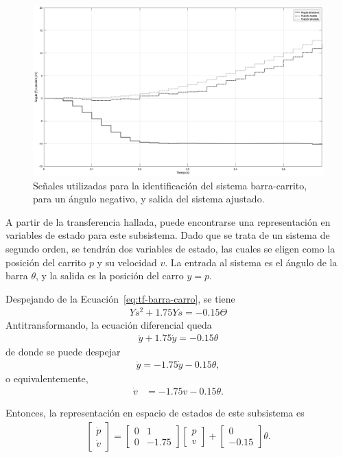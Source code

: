 \begin{figure}[!tbp]
    \centering
    \includegraphics[width=\linewidth]{img/ident-carrito2.eps}
    \caption{Señales utilizadas para la identificación del sistema barra-carrito, para un ángulo negativo, y salida del sistema ajustado.}
    \label{fig:ident-carro2}
\end{figure}

A partir de la transferencia hallada, puede encontrarse una representación en variables de estado para este subsistema. Dado que se trata de un sistema de segundo orden, se tendrán dos variables de estado, las cuales se eligen como la posición del carrito $p$ y su velocidad $v$. La entrada al sistema es el ángulo de la barra $\theta$, y la salida es la posición del carro $y = p$.

Despejando de la Ecuación~\eqref{eq:tf-barra-carro}, se tiene
\begin{align*}
    Ys^{2} + 1.75 Y s = -0.15 \Theta
\end{align*}
Antitransformando, la ecuación diferencial queda
\begin{align*}
    \ddot{y} + 1.75 \dot{y} = -0.15 \theta
\end{align*}
de donde se puede despejar
\begin{align*}
    \ddot{y} = -1.75 \dot{y} - 0.15 \theta,
\end{align*}
o equivalentemente,
\begin{align*}
    \dot{v} &= -1.75 v - 0.15 \theta.
\end{align*}

Entonces, la representación en espacio de estados de este subsistema es
\begin{align*}
    \begin{bmatrix} \dot{p} \\ \dot{v} \end{bmatrix} =
        \begin{bmatrix} 0 & 1 \\ 0 & -1.75 \end{bmatrix} \begin{bmatrix} p \\ v \end{bmatrix}
        + \begin{bmatrix} 0 \\ - 0.15 \end{bmatrix} \theta.
\end{align*}

